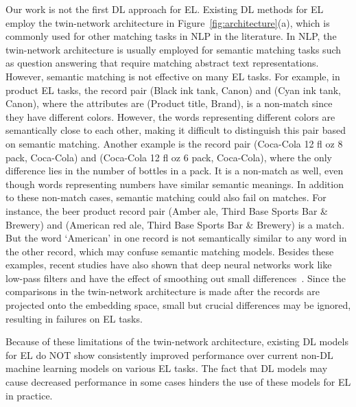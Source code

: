 \documentclass[conference]{IEEEtran}
\begin{document}
Our work is not the first DL approach for EL. Existing DL methods for EL~\cite{ebraheem2018distributed,mudgal2018deep} employ the twin-network architecture in Figure~\ref{fig:architecture}(a), which is commonly used for other matching tasks in NLP in the literature. In NLP, the twin-network architecture is usually employed for semantic matching tasks such as question answering that require matching abstract text representations. However, semantic matching is not effective on many EL tasks. For example, in product EL tasks, the record pair (Black ink tank, Canon) and (Cyan ink tank, Canon), where the attributes are (Product title, Brand), is a non-match since they have different colors. However, the words representing different colors are semantically close to each other, making it difficult to distinguish this pair based on semantic matching. Another example is the record pair (Coca-Cola 12 fl oz 8 pack, Coca-Cola) and (Coca-Cola 12 fl oz 6 pack, Coca-Cola), where the only difference lies in the number of bottles in a pack. It is a non-match as well, even though words representing numbers have similar semantic meanings. In addition to these non-match cases, semantic matching could also fail on matches. For instance, the beer product record pair (Amber ale, Third Base Sports Bar \& Brewery) and (American red ale, Third Base Sports Bar \& Brewery) is a match. But the word `American' in one record is not semantically similar to any word in the other record, which may confuse semantic matching models. Besides these examples, recent studies have also shown that deep neural networks work like low-pass filters and have the effect of smoothing out small  differences~\cite{hamilton2018deep,nt2019revisiting}. Since the comparisons in the twin-network architecture is made after the records are projected onto the embedding space, small but crucial differences may be ignored, resulting in failures on EL tasks.

Because of these limitations of the twin-network architecture, existing DL models for EL do NOT show consistently improved performance over current non-DL machine learning models on various EL tasks. The fact that DL models may cause decreased performance in some cases hinders the use of these models for EL in practice.
\end{document}
